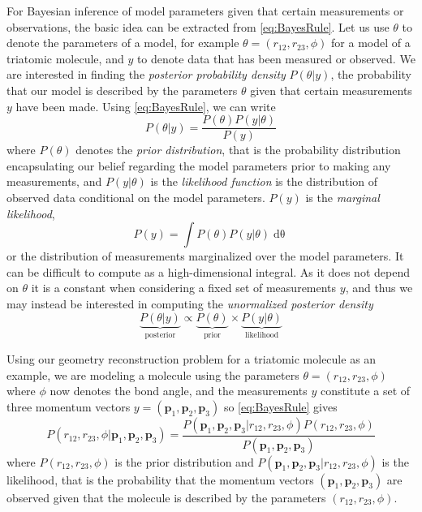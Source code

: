 For Bayesian inference of model parameters given that certain measurements or observations, the basic idea can be extracted from \eqref{eq:BayesRule}. Let us use $\theta$ to denote the parameters of a model, for example $\theta = (r_{12}, r_{23}, \phi)$ for a model of a triatomic molecule, and $y$ to denote data that has been measured or observed. We are interested in finding the \emph{posterior probability density} $P(\theta|y)$, the probability that our model is described by the parameters $\theta$ given that certain measurements $y$ have been made. Using \eqref{eq:BayesRule}, we can write
\begin{equation}
  P(\theta|y) = \frac{P(\theta) P(y|\theta)}{P(y)}
\end{equation}
where $P(\theta)$ denotes the \emph{prior distribution}, that is the probability distribution encapsulating our belief regarding the model parameters prior to making any measurements, and $P(y|\theta)$ is the \emph{likelihood function} is the distribution of observed data conditional on the model parameters. $P(y)$ is the \emph{marginal likelihood},
\begin{equation}
  P(y) = \int P(\theta) P(y|\theta) \mathop{d\theta}
\end{equation}
or the distribution of measurements marginalized over the model parameters. It can be difficult to compute as a high-dimensional integral. As it does not depend on $\theta$ it is a constant when considering a fixed set of measurements $y$, and thus we may instead be interested in computing the \emph{unormalized posterior density}
\begin{equation}
  \underbrace{P(\theta|y)}_\mathrm{posterior}
  \propto
  \underbrace{P(\theta)}_\mathrm{prior}
  \times
  \underbrace{P(y|\theta)}_\mathrm{likelihood}
\end{equation}

Using our geometry reconstruction problem for a triatomic molecule as an example, we are modeling a molecule using the parameters $\theta = (r_{12}, r_{23}, \phi)$ where $\phi$ now denotes the bond angle, and the measurements $y$ constitute a set of three momentum vectors $y = (\mathbf{p}_1, \mathbf{p}_2, \mathbf{p}_3)$ so \eqref{eq:BayesRule} gives
\begin{equation} \label{eq:BayesGeometry}
  P(r_{12}, r_{23}, \phi|\mathbf{p}_1, \mathbf{p}_2, \mathbf{p}_3) = \frac{P(\mathbf{p}_1, \mathbf{p}_2, \mathbf{p}_3|r_{12}, r_{23}, \phi) P(r_{12}, r_{23}, \phi)}{P(\mathbf{p}_1, \mathbf{p}_2, \mathbf{p}_3)}
\end{equation}
where $P(r_{12}, r_{23}, \phi)$ is the prior distribution and $P(\mathbf{p}_1, \mathbf{p}_2, \mathbf{p}_3|r_{12}, r_{23}, \phi)$ is the likelihood, that is the probability that the momentum vectors $(\mathbf{p}_1, \mathbf{p}_2, \mathbf{p}_3)$ are observed given that the molecule is described by the parameters $(r_{12}, r_{23}, \phi)$.

